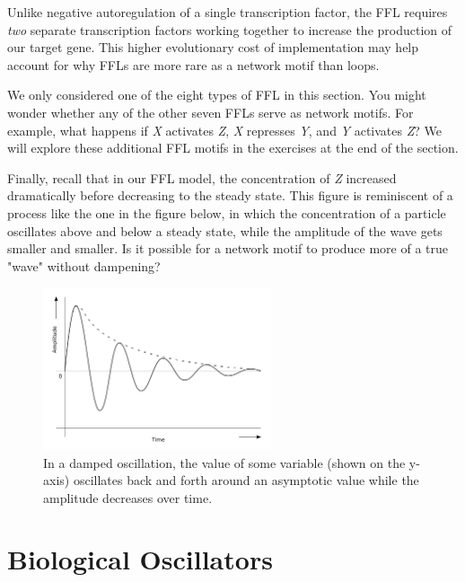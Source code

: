 Unlike negative autoregulation of a single transcription factor, the FFL requires \textit{two} separate transcription factors working together to increase the production of our target gene. This higher evolutionary cost of implementation may help account for why FFLs are more rare as a network motif than loops.

We only considered one of the eight types of FFL in this section. You might wonder whether any of the other seven FFLs serve as network motifs.  For example, what happens if \textit{X} activates \textit{Z}, \textit{X} represses \textit{Y}, and \textit{Y} activates \textit{Z}? We will explore these additional FFL motifs in the exercises at the end of the section.

Finally, recall that in our FFL model, the concentration of \textit{Z} increased dramatically before decreasing to the steady state. This figure is reminiscent of a  process like the one in the figure below, in which the concentration of a particle oscillates above and below a steady state, while the amplitude of the wave gets smaller and smaller. Is it possible for a network motif to produce more of a true "wave" without dampening?

\begin{figure}[h]
\centering
\mySfFamily
\includegraphics[width = 0.6\textwidth]{../images/damped_oscillator.png}
\caption{In a damped oscillation, the value of some variable (shown on the y-axis) oscillates back and forth around an asymptotic value while the amplitude decreases over time.}
\label{fig:damped_oscillator}
\end{figure}


\FloatBarrier
{}

\section{Biological Oscillators}
\label{sec:biological_oscillators}

